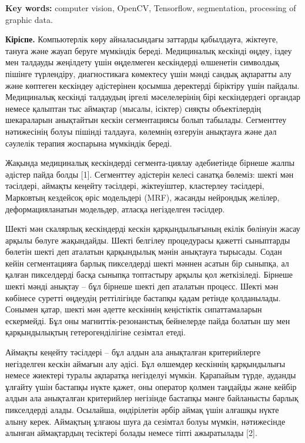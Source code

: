 {\bfseries Key words:} computer vision, OpenCV, Tensorflow, segmentation,
processing of graphic data.
\begin{multicols}{2}

{\bfseries Кіріспе.} Компьютерлік көру айналасындағы заттарды қабылдауға,
жіктеуге, тануға және жауап беруге мүмкіндік береді. Медициналық
кескінді өңдеу, іздеу мен талдауды жеңілдету үшін өңделмеген кескіндерді
өлшенетін символдық пішінге түрлендіру, диагностикаға көмектесу үшін
мәнді сандық ақпаратты алу және көптеген кескіндеу әдістерінен қосымша
деректерді біріктіру үшін пайдалы. Медициналық кескінді талдаудың іргелі
мәселелерінің бірі кескіндердегі органдар немесе қалыптан тыс аймақтар
(мысалы, ісіктер) сияқты объектілердің шекараларын анықтайтын кескін
сегментациясы болып табылады. Сегменттеу нәтижесінің болуы пішінді
талдауға, көлемнің өзгеруін анықтауға және дәл сәулелік терапия
жоспарына мүмкіндік береді.

Жақында медициналық кескіндерді сегмента-циялау әдебиетінде бірнеше жалпы
әдістер пайда болды {[}1{]}. Сегменттеу әдістерін келесі санатқа
бөлеміз: шекті мән тәсілдері, аймақты кеңейту тәсілдері, жіктеуіштер,
кластерлеу тәсілдері, Марковтың кездейсоқ өріс модельдері (MRF), жасанды
нейрондық желілер, деформацияланатын модельдер, атласқа негізделген
тәсілдер.

Шекті мән скалярлық кескіндерді кескін қарқындылығының екілік бөлінуін
жасау арқылы бөлуге жақындайды. Шекті белгілеу процедурасы қажетті
сыныптарды бөлетін шекті деп аталатын қарқындылық мәнін анықтауға
тырысады. Содан кейін сегментацияға барлық пикселдерді шекті мәннен
асатын бір сыныпқа, ал қалған пикселдерді басқа сыныпқа топтастыру
арқылы қол жеткізіледі. Бірнеше шекті мәнді анықтау -- бұл бірнеше шекті
деп аталатын процесс. Шекті мән көбінесе суретті өңдеудің реттілігінде
бастапқы қадам ретінде қолданылады. Сонымен қатар, шекті мән әдетте
кескіннің кеңістіктік сипаттамаларын ескермейді. Бұл оны
магниттік-резонанстық бейнелерде пайда болатын шу мен қарқындылықтың
гетерогенділігіне сезімтал етеді.

Аймақты кеңейту тәсілдері -- бұл алдын ала анықталған критерийлерге
негізделген кескін аймағын алу әдісі. Бұл өлшемдер кескіннің
қарқындылығы немесе жиектері туралы ақпаратқа негізделуі мүмкін.
Қарапайым түрде, ауданды ұлғайту үшін бастапқы нүкте қажет, оны оператор
қолмен таңдайды және кейбір алдын ала анықталған критерийлер негізінде
бастапқы мәнге байланысты барлық пикселдерді алады. Осылайша,
өндірілетін әрбір аймақ үшін алғашқы нүкте алыну керек. Аймақтың ұлғаюы
шуға да сезімтал болуы мүмкін, нәтижесінде алынған аймақтардың тесіктері
болады немесе тіпті ажыратылады {[}2{]}.


\end{multicols}
